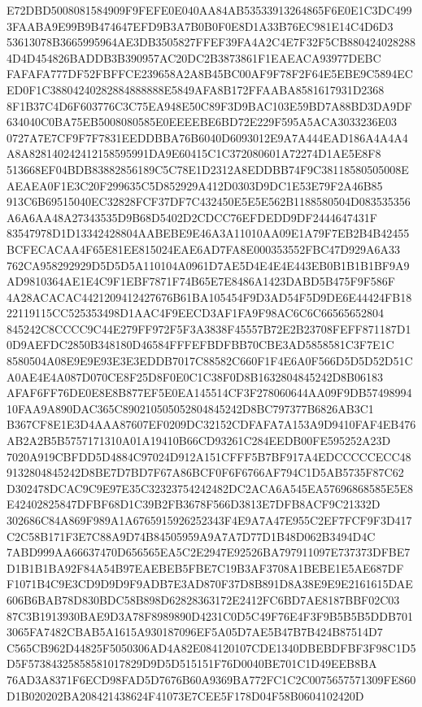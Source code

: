 \documentclass[UTF8,fontset=fandol,zihao=-4,a4paper]{ctexart}
\begin{document}
{{E72DBD5008081584909F9FEFE0E040AA84AB53533913264865F6E0E1C3DC4993FAABA9E99B9B474647EFD9B3A7B0B0F0E8D1A33B76EC981E14C4D6D3
53613078B3665995964AE3DB3505827FFEF39FA4A2C4E7F32F5CB8804240282884D4D454826BADDB3B390957AC20DC2B3873861F1EAEACA93977DEBC
FAFAFA777DF52FBFFCE239658A2A8B45BC00AF9F78F2F64E5EBE9C5894ECED0F1C38804240282884888888E5849AFA8B172FFAABA8581617931D2368
8F1B37C4D6F603776C3C75EA948E50C89F3D9BAC103E59BD7A88BD3DA9DF634040C0BA75EB5008080585E0EEEEBE6BD72E229F595A5ACA3033236E03
0727A7E7CF9F7F7831EEDDBBA76B6040D6093012E9A7A444EAD186A4A4A4A8A828140242412158595991DA9E60415C1C372080601A72274D1AE5E8F8
513668EF04BDB83882856189C5C78E1D2312A8EDDBB74F9C38118580505008EAEAEA0F1E3C20F299635C5D852929A412D0303D9DC1E53E79F2A46B85
913C6B69515040EC32828FCF37DF7C432450E5E5E562B1188580504D083535356A6A6AA48A27343535D9B68D5402D2CDCC76EFDEDD9DF2444647431F
83547978D1D13342428804AABEBE9E46A3A11010AA09E1A79F7EB2B4B42455BCFECACAA4F65E81EE815024EAE6AD7FA8E000353552FBC47D929A6A33
762CA958292929D5D5D5A110104A0961D7AE5D4E4E4E443EB0B1B1B1BF9A9AD9810364AE1E4C9F1EBF7871F74B65E7E8486A1423DABD5B475F9F586F
4A28ACACAC4421209412427676B61BA105454F9D3AD54F5D9DE6E44424FB1822119115CC525353498D1AAC4F9EECD3AF1FA9F98AC6C6C66565652804
845242C8CCCC9C44E279FF972F5F3A3838F45557B72E2B23708FEFF871187D10D9AEFDC2850B348180D46584FFFEFBDFBB70CBE3AD5858581C3F7E1C
8580504A08E9E9E93E3E3EDDB7017C88582C660F1F4E6A0F566D5D5D52D51CA0AE4E4A087D070CE8F25D8F0E0C1C38F0D8B1632804845242D8B06183
AFAF6FF76DE0E8E8B877EF5E0EA145514CF3F278060644AA09F9DB5749899410FAA9A890DAC365C890210505052804845242D8BC797377B6826AB3C1
B367CF8E1E3D4AAA87607EF0209DC32152CDFAFA7A153A9D9410FAF4EB476AB2A2B5B5757171310A01A19410B66CD93261C284EEDB00FE595252A23D
7020A919CBFDD5D4884C97024D912A151CFFF5B7BF917A4EDCCCCCECC489132804845242D8BE7D7BD7F67A86BCF0F6F6766AF794C1D5AB5735F87C62
D302478DCAC9C9E97E35C32323754242482DC2ACA6A545EA57696868585E5E8E42402825847DFBF68D1C39B2FB3678F566D3813E7DFB8ACF9C21332D
302686C84A869F989A1A6765915926252343F4E9A7A47E955C2EF7FCF9F3D417C2C58B171F3E7C88A9D74B84505959A9A7A7D77D1B48D062B3494D4C
7ABD999AA66637470D656565EA5C2E2947E92526BA797911097E737373DFBE7D1B1B1BA92F84A54B97EAEBEB5FBE7C19B3AF3708A1BEBE1E5AE687DF
F1071B4C9E3CD9D9D9F9ADB7E3AD870F37D8B891D8A38E9E9E2161615DAE606B6BAB78D830BDC58B898D62828363172E2412FC6BD7AE8187BBF02C03
87C3B1913930BAE9D3A78F8989890D4231C0D5C49F76E4F3F9B5B5B5DDB7013065FA7482CBAB5A1615A930187096EF5A05D7AE5B47B7B424B87514D7
C565CB962D44825F5050306AD4A82E084120107CDE1340DBEBDFBF3F98C1D5D5F57384325858581017829D9D5D515151F76D0040BE701C1D49EEB8BA
76AD3A8371F6ECD98FAD5D7676B60A9369BA772FC1C2C0075657571309FE860D1B020202BA208421438624F41073E7CEE5F178D04F58B0604102420D
}}
\end{document}
